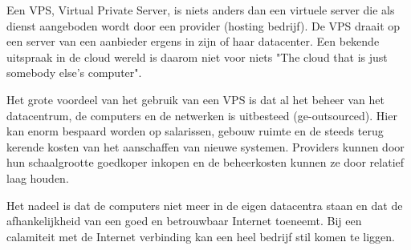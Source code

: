 Een VPS, Virtual Private Server, is niets anders dan een virtuele server die als dienst aangeboden wordt door een provider (hosting bedrijf). De VPS draait op een server van een aanbieder ergens in zijn of haar datacenter. Een bekende uitspraak in de cloud wereld is daarom niet voor niets "The cloud that is just somebody else's computer".

Het grote voordeel van het gebruik van een VPS is dat al het beheer van het datacentrum, de computers en de netwerken is uitbesteed (ge-outsourced). Hier kan enorm bespaard worden op salarissen, gebouw ruimte en de steeds terug kerende kosten van het aanschaffen van nieuwe systemen. Providers kunnen door hun schaalgrootte goedkoper inkopen en de beheerkosten kunnen ze door relatief laag houden.

Het nadeel is dat de computers niet meer in de eigen datacentra staan en dat de afhankelijkheid van een goed en betrouwbaar Internet toeneemt. Bij een calamiteit met de Internet verbinding kan een heel bedrijf stil komen te liggen.
